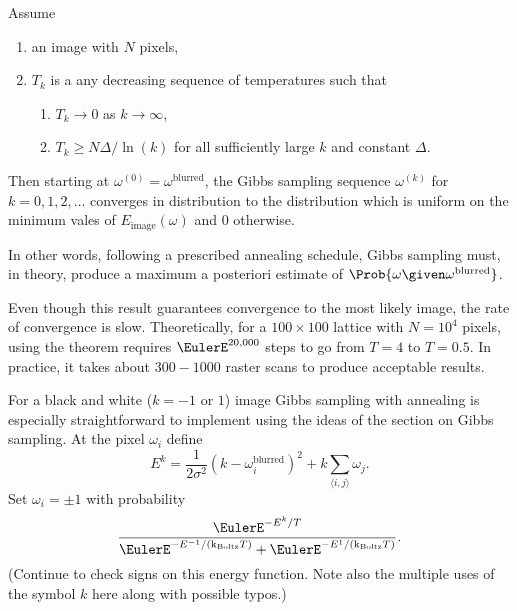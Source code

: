 \documentclass[12pt]{article}
\newcommand{\kT}{{\text k}_{\text{Boltz}}T}
\begin{document}
\begin{theorem}
    Assume
    \begin{enumerate}
        \item
            an image with \( N \) pixels,
        \item
            \( T_k \) is a any decreasing sequence of temperatures such
            that
            \begin{enumerate}
                \item
                    \( T_k \to 0 \) as \( k \to \infty \),
                \item
                    \( T_k \ge N \Delta/\ln(k) \) for all sufficiently
                    large \( k \) and constant \( \Delta \).
            \end{enumerate}
    \end{enumerate}
    Then starting at \( \omega^{(0)} = \omega^{\text{blurred}} \), the
    Gibbs sampling sequence \( \omega^{(k)} \) for \( k=0,1,2, \dots \)
    converges in distribution to the distribution which is uniform on
    the minimum vales of \( E_{\text{image}}(\omega) \) and \( 0 \)
    otherwise.
\end{theorem}

In other words, following a prescribed annealing schedule, Gibbs
sampling must, in theory, produce a maximum a posteriori estimate of \(
\Prob{\omega \given \omega^{\text{blurred}}} \).

Even though this result guarantees convergence to the most likely image,
the rate of convergence is slow.  Theoretically, for a \( 100 \times 100
\) lattice with \( N = 10^4 \) pixels, using the theorem requires \(
\EulerE^{20{,}000} \) steps to go from \( T = 4 \) to \( T = 0.5 \).  In
practice, it takes about \( 300 - 1000 \) raster scans to produce
acceptable results.

For a black and white (\( k = -1 \) or \( 1 \)) image Gibbs sampling with
annealing is especially straightforward to implement using the ideas of
the section on Gibbs sampling.  At the pixel \( \omega_i \) define
\[
    E^k = \frac{1}{2 \sigma^2}( k - \omega_i^{\text{blurred}})^2 + k
    \sum\limits_{\langle i,j\rangle} \omega_j.
\] Set \( \omega_i = \pm 1 \) with probability
\[
    \frac{\EulerE^{-E^k/T}}{\EulerE^{-E^{-1}/(\kT)} + \EulerE^{-E^1/(\kT)}}.
\] (Continue to check signs on this energy function.  Note also the
multiple uses of the symbol \( k \) here along with possible typos.)

\end{document}
